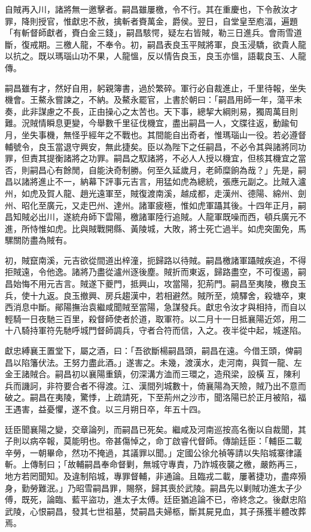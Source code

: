 \begin{pinyinscope}
自賊再入川，諸將無一邀擊者。嗣昌雖屢檄，令不行。其在重慶也，下令赦汝才罪，降則授官，惟獻忠不赦，擒斬者賚萬金，爵侯。翌日，自堂皇至庖湢，遍題「有斬督師獻者，賚白金三錢」，嗣昌駭愕，疑左右皆賊，勒三日進兵。會雨雪道斷，復戒期。三檄人龍，不奉令。初，嗣昌表良玉平賊將軍，良玉浸驕，欲貴人龍以抗之。既以瑪瑙山功不果，人龍慍，反以情告良玉，良玉亦慍，語載良玉、人龍傳。

嗣昌雖有才，然好自用，躬親簿書，過於繁碎。軍行必自裁進止，千里待報，坐失機會。王鰲永嘗諫之，不納。及鰲永罷官，上書於朝曰：「嗣昌用師一年，蕩平未奏，此非謀慮之不長，正由操心之太苦也。天下事，總挈大綱則易，獨周萬目則難。況賊情瞬息更變，今舉數千里征伐機宜，盡出嗣昌一人，文牒往返，動踰旬月，坐失事機，無怪乎經年之不戰也。其間能自出奇者，惟瑪瑙山一役。若必遵督輔號令，良玉當退守興安，無此捷矣。臣以為陛下之任嗣昌，不必令其與諸將同功罪，但責其提衡諸將之功罪。嗣昌之馭諸將，不必人人授以機宜，但核其機宜之當否，則嗣昌心有餘閒，自能決奇制勝。何至久延歲月，老師糜餉為哉？」先是，嗣昌以諸將進止不一，納幕下評事元吉言，用猛如虎為總統，張應元副之。比賊入瀘州，如虎及賀人龍、趙光遠軍至，賊復渡南溪，越成都，走漢州、德陽、綿州、劍州、昭化至廣元，又走巴州、達州。諸軍疲極，惟如虎軍躡其後。十四年正月，嗣昌知賊必出川，遂統舟師下雲陽，檄諸軍陸行追賊。人龍軍既噪而西，頓兵廣元不進，所恃惟如虎。比與賊戰開縣、黃陵城，大敗，將士死亡過半。如虎突圍免，馬騾關防盡為賊有。

初，賊竄南溪，元吉欲從間道出梓潼，扼歸路以待賊。嗣昌檄諸軍躡賊疾追，不得拒賊遠，令他逸。諸將乃盡從瀘州逐後塵。賊折而東返，歸路盡空，不可復遏，嗣昌始悔不用元吉言。賊遂下夔門，抵興山，攻當陽，犯荊門。嗣昌至夷陵，檄良玉兵，使十九返。良玉撤興、房兵趨漢中，若相避然。賊所至，燒驛舍，殺塘卒，東西消息中斷。鄖陽撫治袁繼咸聞賊至當陽，急謀發兵。獻忠令汝才與相持，而自以輕騎一日夜馳三百里，殺督師使者於道，取軍符。以二月十一日抵襄陽近郊，用二十八騎持軍符先馳呼城門督師調兵，守者合符而信，入之。夜半從中起，城遂陷。

獻忠縛襄王置堂下，屬之酒，曰：「吾欲斷楊嗣昌頭，嗣昌在遠。今借王頭，俾嗣昌以陷籓伏法。王努力盡此酒。」遂害之。未幾，渡漢水，走河南，與賀一龍、左金王諸賊合。嗣昌初以襄陽重鎮，仞深溝方洫而三環之，造飛梁，設橫互，陳利兵而譏訶，非符要合者不得渡。江、漢間列城數十，倚襄陽為天險，賊乃出不意而破之。嗣昌在夷陵，驚悸，上疏請死，下至荊州之沙市，聞洛陽已於正月被陷，福王遇害，益憂懼，遂不食。以三月朔日卒，年五十四。

廷臣聞襄陽之變，交章論列，而嗣昌已死矣。繼咸及河南巡按高名衡以自裁聞，其子則以病卒報，莫能明也。帝甚傷悼之，命丁啟睿代督師。傳諭廷臣：「輔臣二載辛勞，一朝畢命，然功不掩過，其議罪以聞。」定國公徐允禎等請以失陷城寨律議斬。上傳制曰；「故輔嗣昌奉命督剿，無城守專責，乃詐城夜襲之檄，嚴飭再三，地方若罔聞知。及違制陷城，專罪督輔，非通論。且臨戎二載，屢著捷功，盡瘁殞身，勤勞難泯。」乃昭雪嗣昌罪，賜祭，歸其喪於武陵。嗣昌先以剿賊功進太子少傅，既死，論臨、藍平盜功，進太子太傅。廷臣猶追論不已，帝終念之。後獻忠陷武陵，心恨嗣昌，發其七世祖墓，焚嗣昌夫婦柩，斷其屍見血，其子孫獲半體改葬焉。


\end{pinyinscope}
